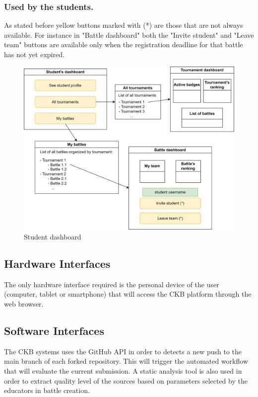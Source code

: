 \subsubsection*{Used by the students.}
As stated before yellow buttons marked with (*) are those that are not always available. For instance in "Battle dashboard" both the "Invite student" and "Leave team" buttons are available only when the registration deadline for that battle has not yet expired.
\begin{figure}[h]
    \centering
    \includegraphics[scale=0.7]{images/student_dashboard.png}
    \caption{Student dashboard}
    \label{fig:stuDash}
\end{figure}

\subsection{Hardware Interfaces}
The only hardware interface required is the personal device of the user (computer, tablet or smartphone) that will access the CKB platform through the web browser.
\subsection{Software Interfaces}
The CKB systems uses the GitHub API in order to detects a new push to the main branch of each forked repository. This will trigger the automated workflow that will evaluate the current submission. \newline
A static analysis tool is also used in order to extract quality level of the sources based on parameters selected by the educators in battle creation.
